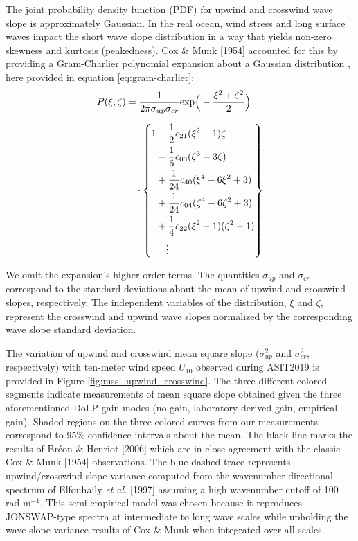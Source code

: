 \documentclass[letterpaper,journal]{IEEEtran}
\begin{document}
	The joint probability density function (PDF) for upwind and crosswind wave slope is approximately Gaussian. In the real ocean, wind stress and long surface waves impact the short wave slope distribution in a way that yields non-zero skewness and kurtosis (peakedness). Cox \& Munk [1954] accounted for this by providing a Gram-Charlier polynomial expansion about a Gaussian distribution \cite{Cox1954a}, here provided in equation \ref{eq:gram-charlier}:
	\begin{align}\label{eq:gram-charlier}
		\begin{split}
			P(\xi,\zeta)
			&= \frac{1}{2\pi\sigma_{up}\sigma_{cr}}\mathrm{exp}\Big(-\frac{\xi^2+\zeta^2}{2}\Big)          \\[6pt]
			&\quad\hfill
			\cdot\left\{
			\begin{aligned}
				1 &- \frac{1}{2}c_{21}(\xi^2-1)\zeta\\
				&- \frac{1}{6}c_{03}(\zeta^3-3\zeta)\\
				&+ \frac{1}{24}c_{40}(\xi^4-6\xi^2+3)\\
				&+ \frac{1}{24}c_{04}(\zeta^4-6\zeta^2+3)\\
				&+ \frac{1}{4}c_{22}(\xi^2-1)(\zeta^2-1)\\
				&\quad\vdots
			\end{aligned}
			\right\}
		\end{split}
	\end{align}
	
	We omit the expansion's higher-order terms. The quantities $\sigma_{up}$ and $\sigma_{cr}$ correspond to the standard deviations about the mean of upwind and crosswind slopes, respectively. The independent variables of the distribution, $\xi$ and $\zeta$, represent the crosswind and upwind wave slopes normalized by the corresponding wave slope standard deviation.
	
	The variation of upwind and crosswind mean square slope ($\sigma_{up}^2$ and $\sigma_{cr}^2$, respectively) with ten-meter wind speed $U_{10}$ observed during ASIT2019 is provided in Figure \ref{fig:mss_upwind_crosswind}. The three different colored segments indicate measurements of mean square slope obtained given the three aforementioned DoLP gain modes (no gain, laboratory-derived gain, empirical gain). Shaded regions on the three colored curves from our measurements correspond to 95\% confidence intervals about the mean. The black line marks the results of Br\'eon \& Henriot [2006] \cite{Breon2006} which are in close agreement with the classic Cox \& Munk [1954] \cite{Cox1954a} observations. The blue dashed trace represents upwind/crosswind slope variance computed from the wavenumber-directional spectrum of Elfouhaily \emph{et al.} [1997] assuming a high wavenumber cutoff of 100 rad m$^{-1}$. This semi-empirical model \cite{Elfouhaily1997} was chosen because it reproduces JONSWAP-type spectra \cite{Hasselmann1973} at intermediate to long wave scales while upholding the wave slope variance results of Cox \& Munk \cite{Cox1954a} when integrated over all scales.
	
\end{document}
